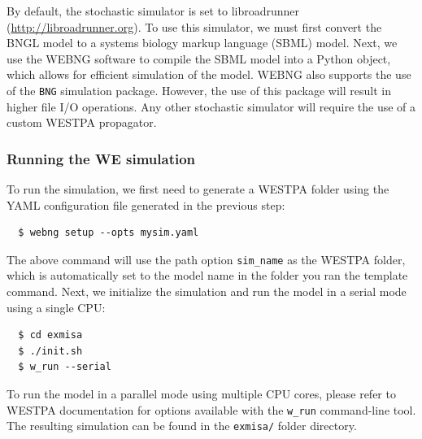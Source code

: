 By default, the stochastic simulator is set to libroadrunner ({\url{http://libroadrunner.org}}). 
To use this simulator, we must first convert the BNGL model to a systems biology markup language (SBML) model. 
Next, we use the WEBNG software to compile the SBML model into a Python object, which allows for efficient simulation of the model. 
WEBNG also supports the use of the \verb|BNG| simulation package. 
However, the use of this package will result in higher file I/O operations. 
Any other stochastic simulator will require the use of a custom WESTPA propagator.

\subsubsection{Running the WE simulation}
To run the simulation, we first need to generate a WESTPA folder using the YAML configuration file generated in the previous step:

\begin{verbatim}
  $ webng setup --opts mysim.yaml
\end{verbatim}

The above command will use the path option \verb|sim_name| as the WESTPA folder, which is automatically set to the model name in the folder you ran the template command. 
Next, we initialize the simulation and run the model in a serial mode using a single CPU: 

\begin{verbatim}
  $ cd exmisa
  $ ./init.sh
  $ w_run --serial
\end{verbatim}

To run the model in a parallel mode using multiple CPU cores, please refer to WESTPA documentation for options available with the \verb|w_run| command-line tool.
The resulting simulation can be found in the \verb|exmisa/| folder directory.

